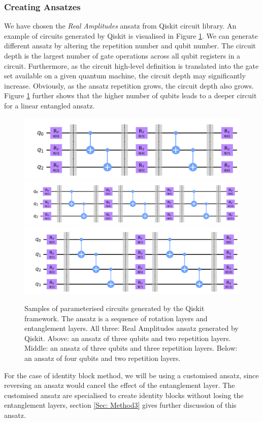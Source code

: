 \subsubsection{Creating Ansatzes} \label{Sec: Creating Ansatzes}
We have chosen the \textit{Real Amplitudes} ansatz from Qiskit circuit library.
An example of circuits generated by Qiskit is visualised in Figure \ref{Fig: Ansatz samples}.
We can generate different ansatz by altering the repetition number and qubit number.
The circuit depth is the largest number of gate operations across all qubit registers in a circuit.
Furthermore, as the circuit high-level definition is translated into the gate set available on a given quantum machine, the circuit depth may significantly increase.
Obviously, as the ansatz repetition grows, the circuit depth also grows.
Figure \ref{Fig: Ansatz samples} further shows that the higher number of qubits leads to a deeper circuit for a linear entangled ansatz.

\begin{figure}
    \includegraphics[width=\linewidth]{Artefact/Appendices/ansatz3-2.png}
    \includegraphics[width=\linewidth]{Artefact/Appendices/ansatz3-3.png}
    \includegraphics[width=\linewidth]{Artefact/Appendices/ansatz4-2.png}
    \caption{
        Samples of parameterised circuits generated by the Qiskit framework.
        The ansatz is a sequence of rotation layers and entanglement layers.
        All three: Real Amplitudes ansatz generated by Qiskit.
        Above: an ansatz of three qubits and two repetition layers.
        Middle: an ansatz of three qubits and three repetition layers.
        Below: an ansatz of four qubits and two repetition layers.
    }
    \label{Fig: Ansatz samples}
\end{figure}

For the case of identity block method, we will be using a customised ansatz, since reversing an ansatz would cancel the effect of the entanglement layer.
The customised ansatz are specialised to create identity blocks without losing the entanglement layers, section \ref{Sec: Method3} gives further discussion of this ansatz.